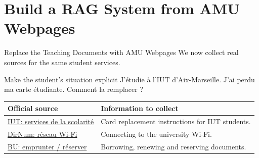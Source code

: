\documentclass[aspectratio=169]{beamer}
\begin{document}
\section{Build a RAG System from AMU Webpages}

\begin{frame}{Replace the Teaching Documents with AMU Webpages}
  \small We now collect real sources for the same student services.
  \begin{block}{Make the student's situation explicit}
    \small J'étudie à l'IUT d'Aix-Marseille. J'ai perdu ma carte étudiante. Comment la remplacer ?
  \end{block}
  \renewcommand{\arraystretch}{1.4}
  \begin{tabular}{@{}p{4.8cm}p{7.5cm}@{}}
    \toprule
    \textbf{Official source} & \textbf{Information to collect} \\
    \midrule
    \href{https://iut.univ-amu.fr/fr/services-de-scolarite}{IUT: services de la scolarité} & Card replacement instructions for IUT students. \\
    \href{https://dirnum.univ-amu.fr/fr/reseau-fil-wifi}{DirNum: réseau Wi-Fi} & Connecting to the university Wi-Fi. \\
    \href{https://bu.univ-amu.fr/fr/vos-services/emprunter-reserver-documents}{BU: emprunter / réserver} & Borrowing, renewing and reserving documents. \\
    \bottomrule
  \end{tabular}
\end{frame}
\end{document}

